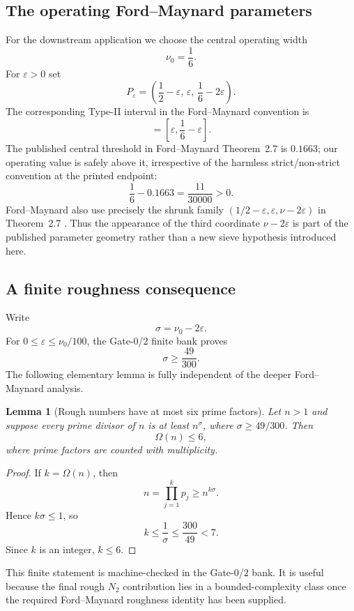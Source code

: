 \documentclass[11pt]{article}
\newtheorem{lemma}[lemma]{Lemma}
\theoremstyle{definition}
\newcommand{\1}{\mathbf 1}
\begin{document}
\subsection{The operating Ford--Maynard parameters}
For the downstream application we choose the central operating width
\[
    \nu_0=\frac16.
\]
For $\varepsilon>0$ set
\begin{equation}
  P_\varepsilon
   =\left(\frac12-\varepsilon,\,\varepsilon,\,
            \frac16-2\varepsilon\right).
  \label{eq:Peps}
\end{equation}
The corresponding Type-II interval in the Ford--Maynard convention is
\begin{equation}
    [\theta,\theta+\nu]
    =\left[\varepsilon,\frac16-\varepsilon\right].
    \label{eq:fm-typeii-window}
\end{equation}
The published central threshold in Ford--Maynard Theorem~2.7 is $0.1663$;
our operating value is safely above it, irrespective of the harmless
strict/non-strict convention at the printed endpoint:
\begin{equation}
   \frac16-0.1663
   =\frac{11}{30000}>0.
   \label{eq:fm-margin}
\end{equation}
Ford--Maynard also use precisely the shrunk family
$(1/2-\varepsilon,\varepsilon,\nu-2\varepsilon)$ in Theorem~2.7
\cite{FordMaynard2024}.  Thus the appearance of the third coordinate
$\nu-2\varepsilon$ is part of the published parameter geometry rather than a
new sieve hypothesis introduced here.

\subsection{A finite roughness consequence}
Write
\[
    \sigma=\nu_0-2\varepsilon.
\]
For $0\le\varepsilon\le\nu_0/100$, the Gate-0/2 finite bank proves
\begin{equation}
    \sigma\ge \frac{49}{300}.
    \label{eq:sigma-49-300}
\end{equation}
The following elementary lemma is fully independent of the deeper
Ford--Maynard analysis.

\begin{lemma}[Rough numbers have at most six prime factors]
\label{lem:omega6}
Let $n>1$ and suppose every prime divisor of $n$ is at least $n^\sigma$,
where $\sigma\ge49/300$.  Then
\[
    \Omega(n)\le6,
\]
where prime factors are counted with multiplicity.
\end{lemma}
\begin{proof}
If $k=\Omega(n)$, then
\[
   n=\prod_{j=1}^k p_j\ge n^{k\sigma}.
\]
Hence $k\sigma\le1$, so
\[
   k\le\frac1\sigma\le\frac{300}{49}<7.
\]
Since $k$ is an integer, $k\le6$.
\end{proof}
This finite statement is machine-checked in the Gate-0/2 bank.  It is useful
because the final rough $N_2$ contribution lies in a bounded-complexity class
once the required Ford--Maynard roughness identity has been supplied.
\end{document}
